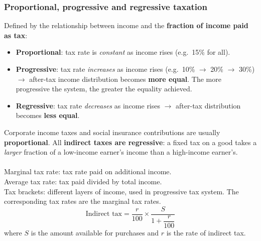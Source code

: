 \documentclass[a4paper,12pt]{article}
\begin{document}
\subsubsection*{Proportional, progressive and regressive taxation}
Defined by the relationship between income and the \textbf{fraction of income paid as tax}:
\begin{itemize}
  \item \textbf{Proportional}: tax rate is \textit{constant} as income rises (e.g.\ 15\% for all).
  \item \textbf{Progressive}: tax rate \textit{increases} as income rises (e.g.\ 10\% $\to$ 20\% $\to$ 30\%) $\to$ after-tax income distribution becomes \textbf{more equal}. The more progressive the system, the greater the equality achieved.
  \item \textbf{Regressive}: tax rate \textit{decreases} as income rises $\to$ after-tax distribution becomes \textbf{less equal}.
\end{itemize}
Corporate income taxes and social insurance contributions are usually \textbf{proportional}. All \textbf{indirect taxes are regressive}: a fixed tax on a good takes a \textit{larger} fraction of a low-income earner's income than a high-income earner's. 
\\\\Marginal tax rate: tax rate paid on additional income.\\
Average tax rate: tax paid divided by total income.\\
Tax brackets: different layers of income, used in progressive tax system. The corresponding tax rates are the marginal tax rates.
\[\text{Indirect tax}=\dfrac{r}{100}\times \dfrac{S}{1+\dfrac{r}{100}}\]
where $S$ is the amount available for purchases and $r$ is the rate of indirect tax.
\end{document}
